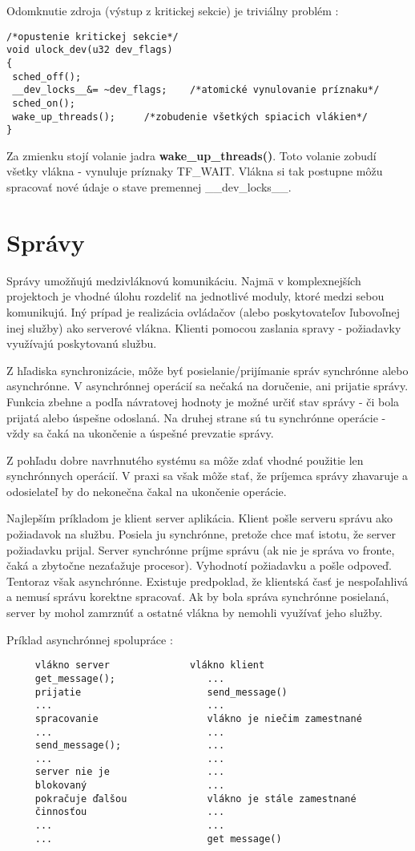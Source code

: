 Odomknutie zdroja (výstup z kritickej sekcie) je triviálny problém :
{\small
\begin{verbatim}
/*opustenie kritickej sekcie*/
void ulock_dev(u32 dev_flags)
{
 sched_off();
 __dev_locks__&= ~dev_flags;	/*atomické vynulovanie príznaku*/
 sched_on();
 wake_up_threads();		/*zobudenie všetkých spiacich vlákien*/
}
\end{verbatim}
}

Za zmienku stojí volanie jadra \textbf{wake\_up\_threads()}. Toto volanie zobudí všetky vlákna - vynuluje príznaky TF\_WAIT. Vlákna si tak postupne môžu spracovať nové údaje o stave premennej \_\_dev\_locks\_\_.

\section{Správy}

Správy umožňujú medzivláknovú komunikáciu. Najmä v komplexnejších projektoch je vhodné úlohu rozdeliť na jednotlivé moduly, ktoré medzi sebou komunikujú. Iný prípad je realizácia ovládačov (alebo poskytovateľov ľubovoľnej inej služby) ako serverové vlákna. Klienti pomocou zaslania spravy - požiadavky využívajú poskytovanú službu. 

Z hľadiska synchronizácie, môže byť posielanie/prijímanie správ synchrónne alebo asynchrónne. V asynchrónnej operácií sa nečaká na doručenie, ani prijatie správy. Funkcia zbehne a podľa návratovej hodnoty je možné určiť stav správy - či bola prijatá alebo úspešne odoslaná. Na druhej strane sú tu synchrónne operácie - vždy sa čaká na ukončenie a úspešné prevzatie správy.

Z pohľadu dobre navrhnutého systému sa môže zdať vhodné použitie len synchrónnych operácií. V praxi sa však môže stať, že príjemca správy zhavaruje a odosielateľ by do nekonečna čakal na ukončenie operácie.

Najlepším príkladom je klient server aplikácia. Klient pošle serveru správu ako požiadavok na službu. Posiela ju synchrónne, pretože chce mať istotu, že server požiadavku prijal. Server synchrónne príjme správu (ak nie je správa vo fronte, čaká a zbytočne nezaťažuje procesor). Vyhodnotí požiadavku a pošle odpoveď. Tentoraz však asynchrónne. Existuje predpoklad, že klientská časť je nespoľahlivá a nemusí správu korektne spracovať. Ak by bola správa synchrónne posielaná, server by mohol zamrznúť a ostatné vlákna by nemohli využívať jeho služby.

Príklad asynchrónnej spolupráce :
{\small
\begin{verbatim}
     vlákno server              vlákno klient
     get_message();                ...
     prijatie                      send_message()
     ...                           ...
     spracovanie                   vlákno je niečim zamestnané
     ...                           ...
     send_message();               ...
     ...                           ...
     server nie je                 ...
     blokovaný                     ...
     pokračuje ďalšou              vlákno je stále zamestnané
     činnosťou                     ...
     ...                           ...
     ...                           get message()
\end{verbatim}
} 

